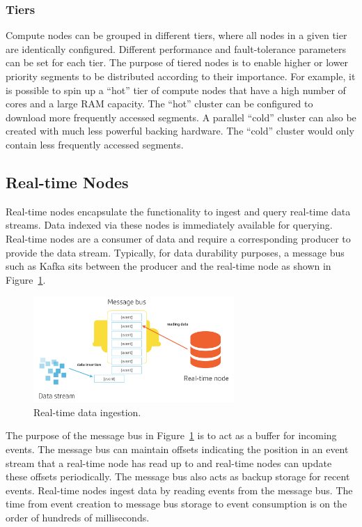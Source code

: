 \documentclass{vldb}
\begin{document}
\subsubsection{Tiers}
\label{sec:tiers}
Compute nodes can be grouped in different tiers, where all nodes in a
given tier are identically configured. Different performance and
fault-tolerance parameters can be set for each tier. The purpose of
tiered nodes is to enable higher or lower priority segments to be
distributed according to their importance. For example, it is possible
to spin up a “hot” tier of compute nodes that have a high number of
cores and a large RAM capacity. The “hot” cluster can be configured to
download more frequently accessed segments. A parallel “cold” cluster
can also be created with much less powerful backing hardware. The
“cold” cluster would only contain less frequently accessed segments.

\subsection{Real-time Nodes}
\label{sec:realtime}
Real-time nodes encapsulate the functionality to ingest and query
real-time data streams. Data indexed via these nodes is immediately
available for querying. Real-time nodes are a consumer of data and
require a corresponding producer to provide the data
stream. Typically, for data durability purposes, a message bus such as
Kafka \cite{kreps2011kafka} sits between the producer and the real-time node as shown
in Figure~\ref{fig:data_reading}.

\begin{figure}
\centering
\includegraphics[width = 3in]{data_reading}
\caption{Real-time data ingestion.}
\label{fig:data_reading}
\end{figure}

The purpose of the message bus in Figure~\ref{fig:data_reading} is to act as a buffer for
incoming events. The message bus can maintain offsets indicating the
position in an event stream that a real-time node has read up to and
real-time nodes can update these offsets periodically. The message bus also acts as backup storage for recent events.
Real-time nodes ingest data by reading events from the message bus. The time from event creation to message bus storage to
event consumption is on the order of hundreds of milliseconds.
\end{document}
